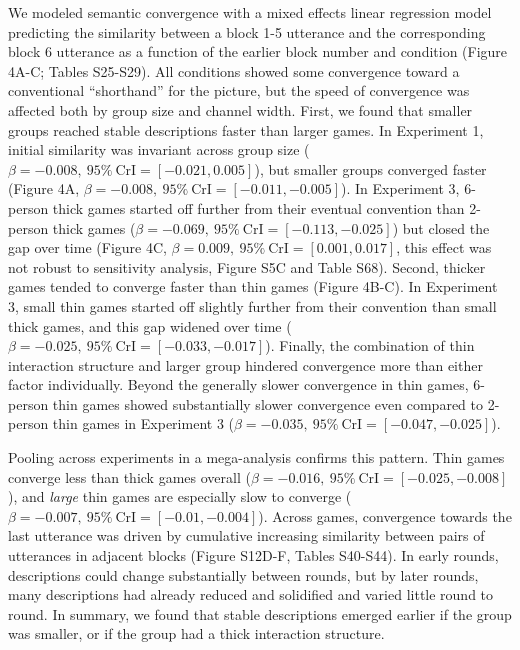 \documentclass[9pt,twocolumn,twoside]{pnas-new}
\begin{document}
We modeled semantic convergence with a mixed effects linear regression
model predicting the similarity between a block 1-5 utterance and the
corresponding block 6 utterance as a function of the earlier block
number and condition (Figure 4A-C; Tables S25-S29). All
conditions showed some convergence toward a conventional ``shorthand''
for the picture, but the speed of convergence was affected both by group
size and channel width. First, we found that smaller groups reached
stable descriptions faster than larger games. In Experiment 1, initial
similarity was invariant across group size
(\(\beta=-0.008,\:95\%\:\mathrm{CrI}=[-0.021, 0.005]\)), but smaller
groups converged faster (Figure 4A,
\(\beta=-0.008,\:95\%\:\mathrm{CrI}=[-0.011, -0.005]\)). In Experiment
3, 6-person thick games started off further from their eventual
convention than 2-person thick games
(\(\beta=-0.069,\:95\%\:\mathrm{CrI}=[-0.113, -0.025]\)) but closed the
gap over time (Figure 4C,
\(\beta=0.009,\:95\%\:\mathrm{CrI}=[0.001, 0.017]\), this effect was not
robust to sensitivity analysis, Figure S5C and Table S68). Second,
thicker games tended to converge faster than thin games (Figure
4B-C). In Experiment 3, small thin games started off
slightly further from their convention than small thick games, and this
gap widened over time
(\(\beta=-0.025,\:95\%\:\mathrm{CrI}=[-0.033, -0.017]\)). Finally, the
combination of thin interaction structure and larger group hindered
convergence more than either factor individually. Beyond the generally
slower convergence in thin games, 6-person thin games showed
substantially slower convergence even compared to 2-person thin games in
Experiment 3 (\(\beta=-0.035,\:95\%\:\mathrm{CrI}=[-0.047, -0.025]\)).

Pooling across experiments in a mega-analysis confirms this pattern.
Thin games converge less than thick games overall
(\(\beta=-0.016,\:95\%\:\mathrm{CrI}=[-0.025, -0.008]\)), and
\emph{large} thin games are especially slow to converge
(\(\beta=-0.007,\:95\%\:\mathrm{CrI}=[-0.01, -0.004]\)). Across games,
convergence towards the last utterance was driven by cumulative
increasing similarity between pairs of utterances in adjacent blocks (Figure S12D-F, Tables S40-S44). In early rounds, descriptions could
change substantially between rounds, but by later rounds, many
descriptions had already reduced and solidified and varied little round
to round. In summary, we found that stable descriptions emerged earlier
if the group was smaller, or if the group had a thick interaction
structure.
\end{document}
